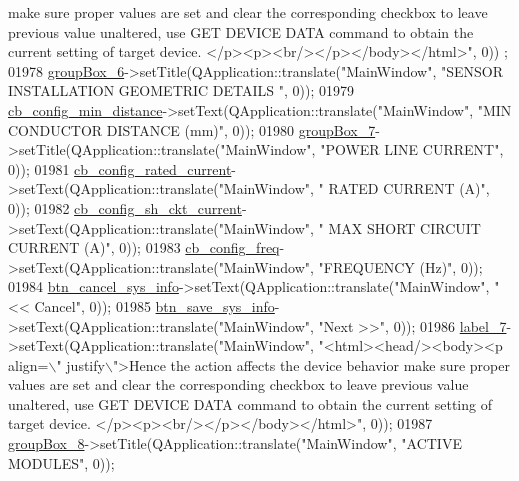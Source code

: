 \begin{DoxyCode}
{       make sure proper values are set and clear the corresponding checkbox to leave previous value unaltered, use
       GET DEVICE DATA command to obtain the current setting of target device. </p><p><br/></p></body></html>"}, 0))
      ;
01978         \hyperlink{a00027_a40a9931365fd3679efec4f0112073db2}{groupBox\_6}->setTitle(QApplication::translate(\textcolor{stringliteral}{"MainWindow"}, \textcolor{stringliteral}{"SENSOR INSTALLATION GEOMETRIC
       DETAILS "}, 0));
01979         \hyperlink{a00027_a6b0d09f3b380fdb810d3da3f5208ccf5}{cb\_config\_min\_distance}->setText(QApplication::translate(\textcolor{stringliteral}{"MainWindow"}, \textcolor{stringliteral}{"MIN
       CONDUCTOR DISTANCE (mm)"}, 0));
01980         \hyperlink{a00027_a269faaef68e4ad4784635810fcae5698}{groupBox\_7}->setTitle(QApplication::translate(\textcolor{stringliteral}{"MainWindow"}, \textcolor{stringliteral}{"POWER LINE CURRENT"}, 0));
01981         \hyperlink{a00027_af4863849ff58931ae3a38aa5b40b8158}{cb\_config\_rated\_current}->setText(QApplication::translate(\textcolor{stringliteral}{"MainWindow"}, \textcolor{stringliteral}{"
      RATED CURRENT (A)"}, 0));
01982         \hyperlink{a00027_a541de6e510677e572ab233f7ecc25e2c}{cb\_config\_sh\_ckt\_current}->setText(QApplication::translate(\textcolor{stringliteral}{"MainWindow"}, \textcolor{stringliteral}{"
      MAX SHORT CIRCUIT CURRENT (A)"}, 0));
01983         \hyperlink{a00027_a8f501acefacd6343a4ec99a67172f256}{cb\_config\_freq}->setText(QApplication::translate(\textcolor{stringliteral}{"MainWindow"}, \textcolor{stringliteral}{"FREQUENCY (Hz)"}, 0));
01984         \hyperlink{a00027_a72415fe77c8f6eb7b13d16177a14b39a}{btn\_cancel\_sys\_info}->setText(QApplication::translate(\textcolor{stringliteral}{"MainWindow"}, \textcolor{stringliteral}{"<< Cancel"}, 
      0));
01985         \hyperlink{a00027_a5ccef61fb3372e70d59a662f4fde5db3}{btn\_save\_sys\_info}->setText(QApplication::translate(\textcolor{stringliteral}{"MainWindow"}, \textcolor{stringliteral}{"Next >>"}, 0));
01986         \hyperlink{a00027_a13936e6f18b1c90402b3c7a3c92b6cdb}{label\_7}->setText(QApplication::translate(\textcolor{stringliteral}{"MainWindow"}, \textcolor{stringliteral}{"<html><head/><body><p align=\(\backslash\)"
      justify\(\backslash\)">Hence the action affects the device behavior make sure proper values are set and clear the corresponding
       checkbox to leave previous value unaltered, use GET DEVICE DATA command to obtain the current setting of
       target device. </p><p><br/></p></body></html>"}, 0));
01987         \hyperlink{a00027_a1a1fe5ec77ba52ba39a16db29ff0f91a}{groupBox\_8}->setTitle(QApplication::translate(\textcolor{stringliteral}{"MainWindow"}, \textcolor{stringliteral}{"ACTIVE MODULES"}, 0));

\end{DoxyCode}
